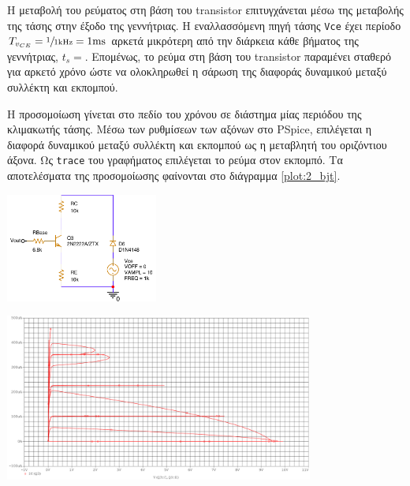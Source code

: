 \setlength{\columnsep}{2pt}
\setlength{\columnseprule}{0pt}
\begin{multicols}{2}
	Η μεταβολή του ρεύματος στη βάση του transistor επιτυγχάνεται μέσω της μεταβολής της τάσης στην έξοδο της γεννήτριας. Η εναλλασσόμενη πηγή τάσης \texttt{Vce} έχει περίοδο $T_{v_{CE}}=\sfrac{1}{1\unit{\kilo\hertz}}=1\unit{\milli\second}$ αρκετά μικρότερη από την διάρκεια κάθε βήματος της γεννήτριας, $t_s=$. Επομένως, το ρεύμα στη βάση του transistor παραμένει σταθερό για αρκετό χρόνο ώστε να ολοκληρωθεί η σάρωση της διαφοράς δυναμικού μεταξύ συλλέκτη και εκπομπού.\par
	Η προσομοίωση γίνεται στο πεδίο του χρόνου σε διάστημα μίας περιόδου της κλιμακωτής τάσης. Μέσω των ρυθμίσεων των αξόνων στο PSpice, επιλέγεται η διαφορά δυναμικού μεταξύ συλλέκτη και εκπομπού ως η μεταβλητή του οριζόντιου άξονα. Ως \texttt{trace} του γραφήματος επιλέγεται το ρεύμα στον εκπομπό. Τα αποτελέσματα της προσομοίωσης φαίνονται στο διάγραμμα \ref{plot:2_bjt}.\par
	\begin{center}
		\begin{circuitfig}[H]
			\centering
			\includegraphics[width=5cm]{spice_02/ask2_bjt_schematic.pdf}
			\caption{Κύκλωμα για τη λήψη των χαρακτηριστικών $v_{CE}-i_C$ ενός BJT. Το κύκλωμα συνδέεται στην έξοδο της γεννήτριας κλιμακωτής τάσης.}
			\label{circ:2_bjt_schematic}
		\end{circuitfig}
	\end{center}
\end{multicols}
\vspace*{-0.35cm}
\begin{plot_fig}[H]
	\begin{center}
		\includegraphics[height=5.5cm]{spice_02/q6.pdf}
		\caption{Χαρακτηριστικές $v_{CE}-i_C$. Οι \textsl{ενδιάμεσες} καμπύλες, μεταξύ των αναμενόμενων καμπυλών, οφείλονται στο γεγονός πως καθώς μεταβάλλεται η έξοδος της γεννήτριας η σάρωση της πηγής \texttt{Vce} του κυκλώματος \ref{circ:2_bjt_schematic} συνεχίζεται.}
		\label{plot:2_bjt}
	\end{center}
\end{plot_fig}
